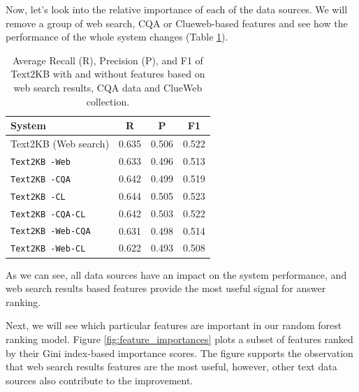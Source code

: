 Now, let's look into the relative importance of each of the data sources.
We will remove a group of web search, CQA or Clueweb-based features and see how the performance of the whole system changes (Table \ref{table:ablation:features}).

\begin{table}
\centering
\begin{tabular}{| p{4cm} | c | c | c | }
\hline
System & R & P &  F1 \\
\hline
Text2KB (Web search) & 0.635 & 0.506 & 0.522 \\
\hline
\texttt{Text2KB -Web} & 0.633 & 0.496 & 0.513 \\
\texttt{Text2KB -CQA} & 0.642 & 0.499 & 0.519 \\
\texttt{Text2KB -CL} & 0.644 & 0.505 & 0.523 \\
\hline
\texttt{Text2KB -CQA-CL} & 0.642 & 0.503 & 0.522 \\
\texttt{Text2KB -Web-CQA} & 0.631 & 0.498 & 0.514 \\
\texttt{Text2KB -Web-CL} & 0.622 & 0.493 & 0.508 \\
\hline
\end{tabular}
\caption{Average Recall (R), Precision (P), and F1 of Text2KB with and without features based on web search results, CQA data and ClueWeb collection.}
\label{table:ablation:features}
\end{table}

As we can see, all data sources have an impact on the system performance, and web search results based features provide the most useful signal for answer ranking.

Next, we will see which particular features are important in our random forest ranking model.
Figure \ref{fig:feature_importances} plots a subset of features ranked by their Gini index-based importance scores.
The figure supports the observation that web search results features are the most useful, however, other text data sources also contribute to the improvement.

